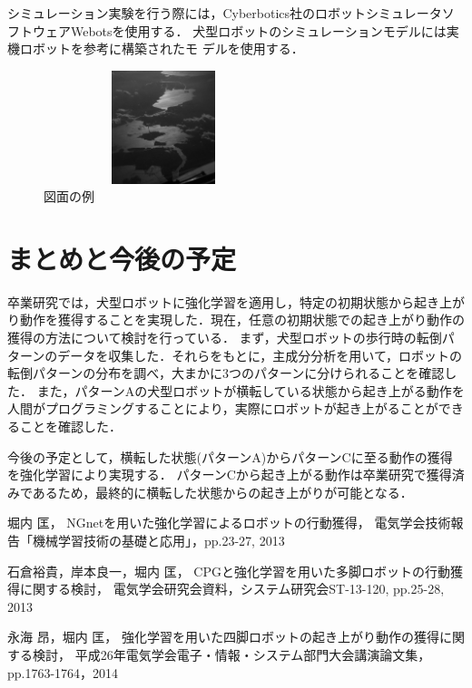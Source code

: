 \documentclass{jarticle}
\begin{document}
シミュレーション実験を行う際には，Cyberbotics社のロボットシミュレータソフトウェアWebotsを使用する．
犬型ロボットのシミュレーションモデルには実機ロボットを参考に構築されたモ
デルを使用する．
\begin{figure}[!b]
  \begin{center}
   \includegraphics[height=33mm,width=70mm]{Fig/Fig1.eps}
   \vspace*{-4mm}
   \caption{図面の例}
   \label{robot}
  \end{center}
\end{figure}
\fi
\vspace*{-2mm}
\section{まとめと今後の予定}

卒業研究では，犬型ロボットに強化学習を適用し，特定の初期状態から起き上がり動作を獲得することを実現した．現在，任意の初期状態での起き上がり動作の獲得の方法について検討を行っている．
まず，犬型ロボットの歩行時の転倒パターンのデータを収集した．それらをもとに，主成分分析を用いて，ロボットの転倒パターンの分布を調べ，大まかに3つのパターンに分けられることを確認した．
また，パターンAの犬型ロボットが横転している状態から起き上がる動作を人間がプログラミングすることにより，実際にロボットが起き上がることができることを確認した．

今後の予定として，横転した状態(パターンA)からパターンCに至る動作の獲得を強化学習により実現する．
パターンCから起き上がる動作は卒業研究で獲得済みであるため，最終的に横転した状態からの起き上がりが可能となる．

\begin{thebibliography}{99}

堀内 匡，
NGnetを用いた強化学習によるロボットの行動獲得，
電気学会技術報告「機械学習技術の基礎と応用」，pp.23-27, 2013

石倉裕貴，岸本良一，堀内 匡，
CPGと強化学習を用いた多脚ロボットの行動獲得に関する検討，
電気学会研究会資料，システム研究会ST-13-120, pp.25-28, 2013

永海 昂，堀内 匡，
強化学習を用いた四脚ロボットの起き上がり動作の獲得に関する検討，
平成26年電気学会電子・情報・システム部門大会講演論文集，pp.1763-1764，2014

\end{thebibliography}
\end{document}
